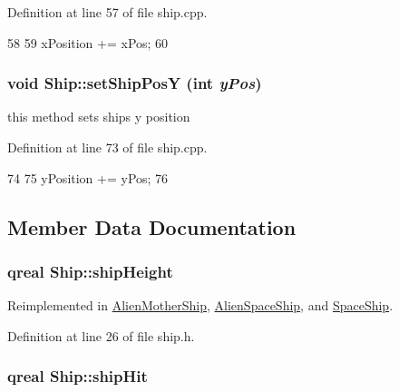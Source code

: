 Definition at line 57 of file ship.cpp.


\begin{DoxyCode}
58 {
59     xPosition += xPos;
60 }
\end{DoxyCode}
\hypertarget{class_ship_add87a9ada3b93bce7b5962e1192b496c}{
\subsubsection[{setShipPosY}]{\setlength{\rightskip}{0pt plus 5cm}void Ship::setShipPosY (int {\em yPos})}}
\label{class_ship_add87a9ada3b93bce7b5962e1192b496c}
this method sets ships y position 

Definition at line 73 of file ship.cpp.


\begin{DoxyCode}
74 {
75     yPosition += yPos;
76 }
\end{DoxyCode}


\subsection{Member Data Documentation}
\hypertarget{class_ship_a16205aae21b89c3fb57960a70be931a2}{
\subsubsection[{shipHeight}]{\setlength{\rightskip}{0pt plus 5cm}qreal {\bf Ship::shipHeight}}}
\label{class_ship_a16205aae21b89c3fb57960a70be931a2}


Reimplemented in \hyperlink{class_alien_mother_ship_acbf3b27133d490435d13650da53da1b0}{AlienMotherShip}, \hyperlink{class_alien_space_ship_a2d4ed13f6240af32719ffcaa25d6586b}{AlienSpaceShip}, and \hyperlink{class_space_ship_a344d1e5b92d9286103aef6e1c27f0a76}{SpaceShip}.

Definition at line 26 of file ship.h.\hypertarget{class_ship_a1fd726a67e6b11d5ce19f4657db40237}{
\subsubsection[{shipHit}]{\setlength{\rightskip}{0pt plus 5cm}qreal {\bf Ship::shipHit}}}
\label{class_ship_a1fd726a67e6b11d5ce19f4657db40237}


